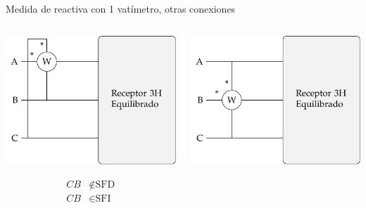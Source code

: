 \documentclass[aspectratio=169, usenames,svgnames,dvipsnames]{beamer}
\begin{document}
\begin{frame}{Medida de reactiva con 1 vatímetro, \hspace{3mm}otras conexiones} \label{diapo:1vat_reactiva_2}
    \begin{columns}
    \begin{column}{0.33\columnwidth}
        \begin{center}
            \includegraphics[width=.9\linewidth]{../figs/Reactiva3H_A-CB.pdf}
        \end{center}

        \vspace{-10mm}
        \begin{align*}
          CB &\notin \text{SFD}\\
          CB &\in \text{SFI}
        \end{align*}
    \end{column}
    \begin{column}{0.33\columnwidth}
        \begin{center}
            \includegraphics[width=.9\linewidth]{../figs/Reactiva3H_B-AC.pdf}
        \end{center}


\end{column}
\end{columns}
\end{frame}
\end{document}
